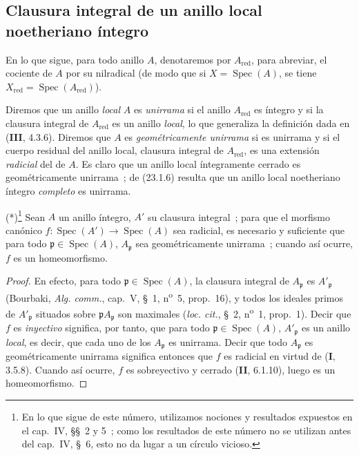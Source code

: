 \subsection{Clausura integral de un anillo local noetheriano íntegro}
\label{subsection:0.23.2-fr}

\begin{env}[23.2.1]
\label{0.23.2.1-fr}
En lo que sigue, para todo anillo $A$, denotaremos por $A_{\mathrm{red}}$, para
abreviar, el cociente de $A$ por su nilradical (de modo que si
$X=\operatorname{Spec}(A)$, se tiene
$X_{\mathrm{red}}=\operatorname{Spec}(A_{\mathrm{red}})$).

Diremos que un anillo \emph{local} $A$ es \emph{unirrama} si el anillo
$A_{\mathrm{red}}$ es íntegro y si la clausura integral de
$A_{\mathrm{red}}$ es un anillo \emph{local}, lo que generaliza la definición
dada en (\textbf{III}, 4.3.6). Diremos que $A$ es \emph{geométricamente
unirrama} si es unirrama y si el cuerpo residual del anillo local,
clausura integral de $A_{\mathrm{red}}$, es una extensión \emph{radicial}
del de $A$. Es claro que un anillo local íntegramente cerrado es
geométricamente unirrama~; de (23.1.6) resulta que un anillo local
noetheriano íntegro \emph{completo} es unirrama.
\end{env}

\begin{lemma}[23.2.2]
\label{0.23.2.2-fr}
\textnormal{(*)}\footnote{En lo que sigue de este número, utilizamos
nociones y resultados expuestos en el cap.~IV, §§~2 y 5~; como los resultados de
este número no se utilizan antes del cap.~IV, §~6, esto no da lugar a un
círculo vicioso.} Sean $A$ un anillo íntegro, $A'$ su clausura integral~; para
que el morfismo canónico
$f:\operatorname{Spec}(A')\to\operatorname{Spec}(A)$ sea radicial, es necesario y
suficiente que para todo $\mathfrak p\in\operatorname{Spec}(A)$,
$A_{\mathfrak p}$ sea geométricamente unirrama~; cuando así ocurre,
$f$ es un homeomorfismo.
\end{lemma}

\begin{proof}
En efecto, para todo $\mathfrak p\in\operatorname{Spec}(A)$, la clausura
integral de $A_{\mathfrak p}$ es $A'_{\mathfrak p}$ (Bourbaki,
\emph{Alg. comm.}, cap.~V, §~1, n\textsuperscript{o}~5, prop.~16), y todos
los ideales primos de $A'_{\mathfrak p}$ situados sobre
$\mathfrak pA_{\mathfrak p}$ son maximales (\emph{loc. cit.}, §~2,
n\textsuperscript{o}~1, prop.~1). Decir que $f$ es \emph{inyectivo} significa, por tanto, que
para todo $\mathfrak p\in\operatorname{Spec}(A)$, $A'_{\mathfrak p}$ es un
anillo \emph{local}, es decir, que cada uno de los $A_{\mathfrak p}$ es
unirrama. Decir que todo $A_{\mathfrak p}$ es geométricamente unirrama
significa entonces que $f$ es radicial en virtud de (\textbf I, 3.5.8). Cuando así
ocurre, $f$ es sobreyectivo y cerrado (\textbf{II}, 6.1.10), luego es un homeomorfismo.
\end{proof}

